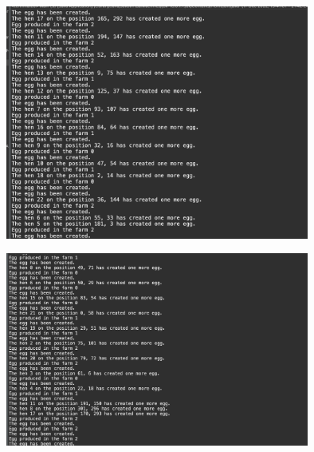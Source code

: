 \documentclass{article}
\begin{document}
\begin{figure}[hbp]
    \centering
    \includegraphics[width=10cm]{Output2.png}
\end{figure}

\begin{figure}[htp]
    \centering
    \includegraphics[width=10cm]{Output3.png}
\end{figure}
\newpage
\end{document}
